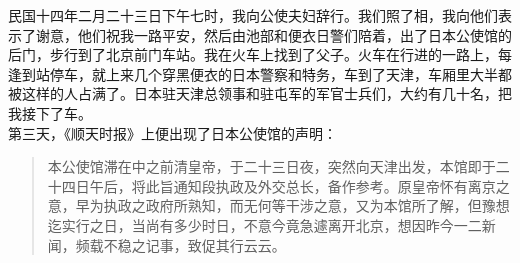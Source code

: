 民国十四年二月二十三日下午七时，我向公使夫妇辞行。我们照了相，我向他们表示了谢意，他们祝我一路平安，然后由池部和便衣日警们陪着，出了日本公使馆的后门，步行到了北京前门车站。我在火车上找到了父子。火车在行进的一路上，每逢到站停车，就上来几个穿黑便衣的日本警察和特务，车到了天津，车厢里大半都被这样的人占满了。日本驻天津总领事和驻屯军的军官士兵们，大约有几十名，把我接下了车。\\

第三天，《顺天时报》上便出现了日本公使馆的声明：\\

\begin{quote}
	本公使馆滞在中之前清皇帝，于二十三日夜，突然向天津出发，本馆即于二十四日午后，将此旨通知段执政及外交总长，备作参考。原皇帝怀有离京之意，早为执政之政府所熟知，而无何等干涉之意，又为本馆所了解，但豫想迄实行之日，当尚有多少时日，不意今竟急遽离开北京，想因昨今一二新闻，频载不稳之记事，致促其行云云。
\end{quote}
